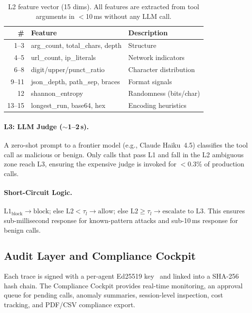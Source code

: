 \documentclass[11pt]{article}
\begin{document}
\begin{table}[t]
\centering
\scriptsize
\caption{L2 feature vector (15 dims). All features are extracted from tool arguments in $<$10\,ms without any LLM call.}
\vspace{-0.1in}
\label{tab:features}
\setlength{\tabcolsep}{2.5pt}
\begin{tabular}{rll}
\toprule
\# & Feature & Description \\
\midrule
1--3 & arg\_count, total\_chars, depth & Structure \\
4--5 & url\_count, ip\_literals & Network indicators \\
6--8 & digit/upper/punct\_ratio & Character distribution \\
9--11 & json\_depth, path\_sep, braces & Format signals \\
12 & shannon\_entropy & Randomness (bits/char) \\
13--15 & longest\_run, base64, hex & Encoding heuristics \\
\bottomrule
\end{tabular}
\vspace{-0.15in}
\end{table}

\paragraph{L3: LLM Judge ($\sim$1--2\,s).}
A zero-shot prompt to a frontier model (e.g., Claude Haiku~4.5) classifies the tool call as malicious or benign.
Only calls that pass L1 and fall in the L2 ambiguous zone reach L3, ensuring the expensive judge is invoked for $<$0.3\% of production calls.

\paragraph{Short-Circuit Logic.}
$\text{L1}_\text{block} \to \text{block}$; else $\text{L2} < \tau_l \to \text{allow}$; else $\text{L2} \ge \tau_l \to \text{escalate to L3}$.
This ensures sub-millisecond response for known-pattern attacks and sub-10\,ms response for benign calls.

\subsection{Audit Layer and Compliance Cockpit}
\label{sec:audit}

Each trace is signed with a per-agent Ed25519 key~\cite{bernstein2012eddsa} and linked into a SHA-256 hash chain.
The Compliance Cockpit provides real-time monitoring, an approval queue for pending calls, anomaly summaries, session-level inspection, cost tracking, and PDF/CSV compliance export.
\end{document}
